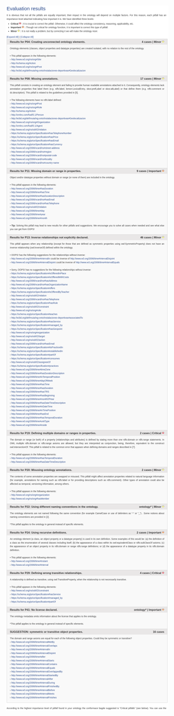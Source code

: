 \documentclass[a4paper,12pt]{article}
\begin{document}
	\begin{figure}[H]
		\begin{subfigure}{.5\textwidth}
			\centering
			\includegraphics[height=\textheight]{include/eval_inicial_oops.png}

\end{subfigure}
\end{figure}
\end{document}

